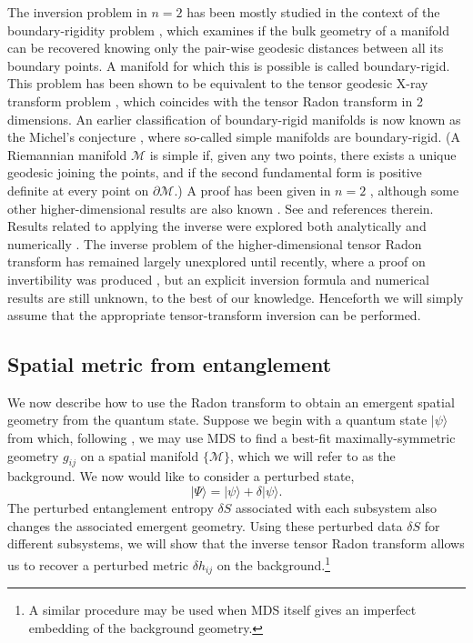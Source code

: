 \documentclass[%
preprint,
nofootinbib,
amsmath,amssymb,
aps,
prd,
showpacs,
superscriptaddress
]{revtex4-1}
\begin{document}
The inversion problem in $n=2$ has been mostly studied in the context of the boundary-rigidity problem  \cite{BRPrev1,Stefanov2008}, which examines if the bulk geometry of a manifold can be recovered knowing only the pair-wise geodesic distances between all its boundary points. A manifold for which this is possible is called boundary-rigid. 
This problem has been shown \cite{sharafutdinov1994integral} to be equivalent to the tensor geodesic X-ray transform problem \cite{john1938,sharafutdinov1994integral, Stefanov2008}, which coincides with the tensor Radon transform in 2 dimensions. An earlier classification of boundary-rigid manifolds is now known as the Michel's conjecture \cite{michel}, where so-called simple manifolds are boundary-rigid. (A Riemannian manifold $\mathcal{M}$ is simple if, given any two points, there exists a unique geodesic joining the points, and if the second fundamental form is positive definite at every point on $\partial\mathcal{M}$.) A proof has been given in $n=2$ \cite{BRP2dproof}, although some other higher-dimensional results are also known \cite{BRPflat}. See  \cite{Stefanov2008,BRPrev2,Croke2004} and references therein. Results related to applying the inverse were explored both analytically \cite{Sharafutdinov2007,Stefanov2014} and numerically \cite{Monard}. 
The inverse problem of the higher-dimensional tensor Radon transform has remained largely unexplored until recently, where a proof on invertibility was produced \cite{uhlmann}, but an explicit inversion formula and numerical results are still unknown, to the best of our knowledge. 
Henceforth we will simply assume that the appropriate tensor-transform inversion can be performed.


\subsection{Spatial metric from entanglement}

We now describe how to use the Radon transform to obtain an emergent spatial geometry from the quantum state.
Suppose we begin with a quantum state $|\psi\rangle$ from which, following \cite{Cao:2016mst}, we may use MDS to find a best-fit maximally-symmetric geometry $g_{ij}$ on a spatial manifold $\{\mathcal{M}\}$, which we will refer to as the background.
We now would like to consider a perturbed state,
\begin{equation}
  |\Psi\rangle = |\psi\rangle + \delta |\psi\rangle.
\end{equation}
The perturbed entanglement entropy $\delta S$ associated with each subsystem also changes the associated emergent geometry. 
Using these perturbed data $\delta S$ for different subsystems, we will show that the inverse tensor Radon transform allows us to recover a perturbed metric $\delta h_{ij}$ on the background.\footnote{A similar procedure may be used when MDS itself gives an imperfect embedding of the background geometry.}  
\end{document}
